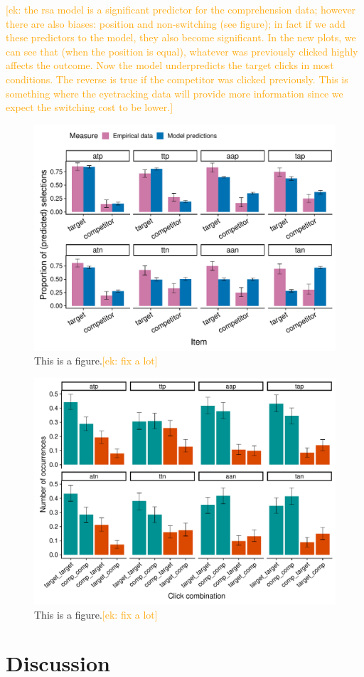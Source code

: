 \documentclass[10pt,letterpaper]{article}
\newcommand{\ek}[1]{\textcolor{Orange}{[ek: #1]}}
\begin{document}
\ek{the rsa model is a significant predictor for the comprehension data; however there are also biases: position and non-switching (see figure); in fact if we add these predictors to the model, they also become significant. In the new plots, we can see that (when the position is equal), whatever was previously clicked highly affects the outcome. Now the model underpredicts the target clicks in most conditions. The reverse is true if the competitor was clicked previously. This is something where the eyetracking data will provide more information since we expect the switching cost to be lower.}

\begin{figure}
	\begin{center}
		\includegraphics[width=.475\textwidth]{graphs/modelflat-bycondition-targetprevClick.pdf}
	\end{center}
\caption{This is a figure.\ek{fix a lot}} 
\label{model-results-flatprior-targetprev}
\end{figure}

\begin{figure}
	\begin{center}
		\includegraphics[width=.475\textwidth]{graphs/switching-bycond.pdf}
	\end{center}
\caption{This is a figure.\ek{fix a lot}} 
\label{switching}
\end{figure}



\section{Discussion}
\end{document}
